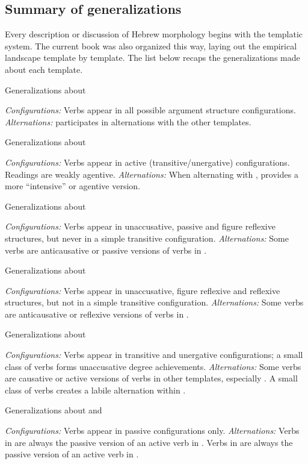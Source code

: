 \subsection{Summary of generalizations}
Every description or discussion of Hebrew morphology begins with the templatic system. The current book was also organized this way, laying out the empirical landscape template by template. The list below recaps the generalizations made about each template.

 \begin{exe}
 \ex  Generalizations about {\tkal}
 \begin{xlist} 
 	\ex  \textit{Configurations:} Verbs appear in all possible argument structure configurations. 
 	\ex  \textit{Alternations:} {\tkal} participates in alternations with the other templates. 
 \z

 \ex  Generalizations about {\tpie}
 \begin{xlist} 
 	\ex  \textit{Configurations:} Verbs appear in active (transitive/unergative) configurations. 
		Readings are weakly agentive.
 	\ex  \textit{Alternations:} When alternating with {\tkal}, {\tpie} provides a more ``intensive'' or agentive version. 
 \z

 \ex  Generalizations about {\tnif}
 \begin{xlist} 
 	\ex  \textit{Configurations:} Verbs appear in unaccusative, passive and figure reflexive structures, but never in a simple transitive configuration. 
 	\ex  \textit{Alternations:} Some verbs are anticausative or passive versions of verbs in {\tkal}. 
 \z

 \ex  Generalizations about {\thit}
 \begin{xlist} 
 	\ex  \textit{Configurations:} Verbs appear in unaccusative, figure reflexive and reflexive structures, but not in a simple transitive configuration. 
 	\ex  \textit{Alternations:} Some verbs are anticausative or reflexive versions of verbs in {\tpie}. 
 \z

 \ex  Generalizations about {\thif}
 \begin{xlist} 
 	\ex  \textit{Configurations:} Verbs appear in transitive and unergative configurations; a small class of verbs forms unaccusative degree achievements. 
 	\ex  \textit{Alternations:} Some verbs are causative or active versions of verbs in other templates, especially {\tkal}. A small class of verbs creates a labile alternation within {\thif}. 
 \z

 \ex  Generalizations about {\tpua} and {\thuf}
 \begin{xlist} 
 	\ex  \textit{Configurations:} Verbs appear in passive configurations only. 
 	\ex  \textit{Alternations:} Verbs in {\tpua} are always the passive version of an active verb in {\tpie}. Verbs in {\thuf} are always the passive version of an active verb in {\thif}. 
 \z
\z 


\end{xlist}
\end{xlist}
\end{xlist}
\end{xlist}
\end{xlist}
\end{xlist}
\end{exe}
